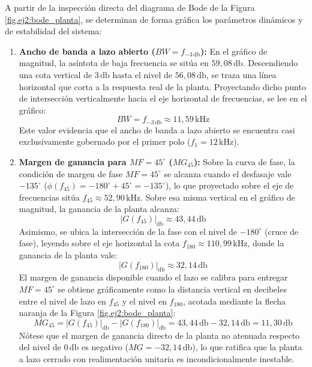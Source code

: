 A partir de la inspección directa del diagrama de Bode de la Figura \ref{fig.ej2:bode_planta}, se determinan de forma
gráfica los parámetros dinámicos y de estabilidad del sistema:

\begin{enumerate}
    \item \textbf{Ancho de banda a lazo abierto ($BW = f_{-3\,\si{\decibel}}$):} En el gráfico de magnitud, la asíntota de baja
    frecuencia se sitúa en $59,08\,\si{\decibel}$. Descendiendo una cota vertical de $3\,\si{\decibel}$ hasta el nivel de
    $56,08\,\si{\decibel}$, se traza una línea horizontal que corta a la respuesta real de la planta. Proyectando dicho punto de
    intersección verticalmente hacia el eje horizontal de frecuencias, se lee en el gráfico:
    \begin{equation}
        BW = f_{-3\,\si{\decibel}} \approx 11,59\,\si{\kilo\hertz}
    \end{equation}
    Este valor evidencia que el ancho de banda a lazo abierto se encuentra casi exclusivamente gobernado por el primer polo
    ($f_1 = 12\,\si{\kilo\hertz}$).
    \item \textbf{Margen de ganancia para $MF = 45^\circ$ ($MG_{45}$):} Sobre la curva de fase, la condición de margen de
    fase $MF = 45^\circ$ se alcanza cuando el desfasaje vale $-135^\circ$ ($\phi(f_{45}) = -180^\circ + 45^\circ = -135^\circ$),
    lo que proyectado sobre el eje de frecuencias sitúa $f_{45} \approx 52,90\,\si{\kilo\hertz}$. Sobre esa misma vertical
    en el gráfico de magnitud, la ganancia de la planta alcanza:
    \begin{equation}
        |G(f_{45})|_{\si{\decibel}} \approx 43,44\,\si{\decibel}
    \end{equation}
    Asimismo, se ubica la intersección de la fase con el nivel de $-180^\circ$ (cruce de fase), leyendo sobre el eje horizontal
    la cota $f_{180} \approx 110,99\,\si{\kilo\hertz}$, donde la ganancia de la planta vale:
    \begin{equation}
        |G(f_{180})|_{\si{\decibel}} \approx 32,14\,\si{\decibel}
    \end{equation}
    El margen de ganancia disponible cuando el lazo se calibra para entregar $MF = 45^\circ$ se obtiene gráficamente como la
    distancia vertical en decibeles entre el nivel de lazo en $f_{45}$ y el nivel en $f_{180}$, acotada mediante la flecha
    naranja de la Figura \ref{fig.ej2:bode_planta}:
    \begin{equation}
        MG_{45} = |G(f_{45})|_{\si{\decibel}} - |G(f_{180})|_{\si{\decibel}} = 43,44\,\si{\decibel} - 32,14\,\si{\decibel} = 11,30\,\si{\decibel}
    \end{equation}
    Nótese que el margen de ganancia directo de la planta no atenuada respecto del nivel de $0\,\si{\decibel}$ es negativo
    ($MG = -32,14\,\si{\decibel}$), lo que ratifica que la planta a lazo cerrado con realimentación unitaria es incondicionalmente
    inestable.
\end{enumerate}

